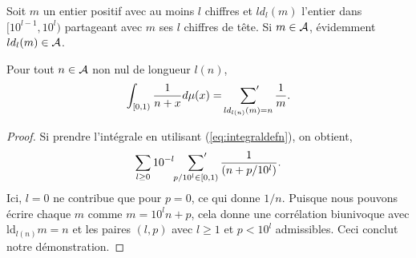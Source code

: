 Soit $m$ un entier positif avec au moins $l$ chiffres et $ld_{l}(m)$ l'entier dans
$[10^{l-1}, 10^{l})$ partageant avec $m$ ses $l$ chiffres de tête. Si
$m\in\mathcal{A}$, évidemment $ld_{l}(m)\in\mathcal{A}$.
\begin{lem}
Pour tout $n\in\mathcal{A}$ non nul de longueur $l(n)$,
\[
	\int_{[0, 1)}\frac{1}{n+x} d\mu(x) = \sideset{}{'}\sum_{ld_{l(n)}(m)=n}\frac{1}{m}.
\]
\label{lem:lemmaburnol}
\end{lem}
\begin{proof}
	Si prendre l'int\'egrale en utilisant (\ref{eq:integraldefn}), on obtient,
	\[
		\sum_{l\ge0} 10^{-l} \sideset{}{'}\sum_{p/10^{l}\in[0, 1)}
		\frac{1}{(n+p/10^{l})}.
	\]
	Ici, $l=0$ ne contribue que pour $p=0$, ce qui donne $1/n$. Puisque
	nous pouvons écrire chaque $m$ comme $m=10^{l}n+p$, cela donne une
	corrélation biunivoque avec ld${}_{l(n)}m = n$ et les paires $(l, p)$ avec
	$l \ge 1$ et $p<10^{l}$ admissibles. Ceci conclut notre démonstration.
\end{proof}
